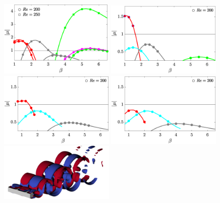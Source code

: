\begin{figure}
  \centering
  \includegraphics[width=0.49\textwidth]{./fig/AR1s/multipliers_AR1.eps}
  \includegraphics[width=0.49\textwidth]{./fig/AR1s/multipliers_AR1p25.eps}
  \includegraphics[width=0.49\textwidth]{./fig/AR1s/multipliers_AR1p5.eps}
  \includegraphics[width=0.49\textwidth]{./fig/AR1s/multipliers_AR1p75.eps} \\
  \includegraphics[width=0.49\textwidth]{./fig/AR1s/Floqetmode_beta_1p2_Re200_AR1_A.png}

\end{figure}
